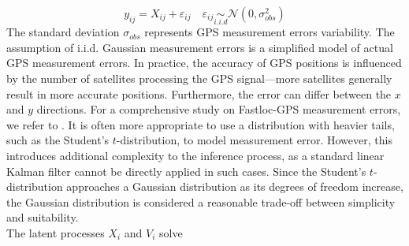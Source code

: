 \documentclass[aoas]{imsart}
\theoremstyle{definition}
\theoremstyle{remark}
\theoremstyle{remark}
\newcommand {\1}{\mathbb{1}}
\begin{document}
\begin{equation}
	y_{ij}=X_{ij}+\varepsilon_{ij} \quad 
	\varepsilon_{ij} \underset{i.i.d}{\sim} \mathcal{N}(0,\sigma_{obs}^2)  
	\label{eq: baseline observations}
\end{equation}
The standard deviation $\sigma_{obs}$ represents GPS measurement errors variability. The assumption of i.i.d. Gaussian measurement errors is a simplified model of actual GPS measurement errors. In practice, the accuracy of GPS positions is influenced by the number of satellites processing the GPS signal—more satellites generally result in more accurate positions. Furthermore, the error can differ between the $x$ and $y$ directions. For a comprehensive study on Fastloc-GPS measurement errors, we refer to \citep{wensveen_path_2015}. It is often more appropriate to use a distribution with heavier tails, such as the Student's $t$-distribution, to model measurement error. However, this introduces additional complexity to the inference process, as a standard linear Kalman filter cannot be directly applied in such cases. Since the Student's $t$-distribution approaches a Gaussian distribution as its degrees of freedom increase, the Gaussian distribution is considered a reasonable trade-off between simplicity and suitability.\\

The latent processes $X_i$ and $V_i$ solve 
\end{document}
